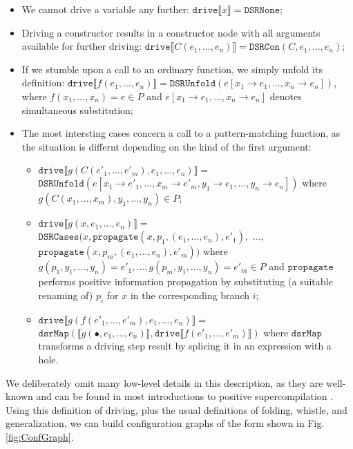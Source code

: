 \documentclass[submission,copyright,creativecommons]{eptcs}
\begin{document}
\begin{itemize}
  \item We cannot drive a variable any further: $\mathtt{drive} \llbracket x \rrbracket = \mathtt{DSRNone}$;
  \item Driving a constructor results in a constructor node with all arguments available for
    further driving: $\mathtt{drive} \llbracket C(e_1, \ldots, e_n) \rrbracket = \mathtt{DSRCon}(C, e_1, \ldots, e_n)$;
  \item If we stumble upon a call to an ordinary function, we simply unfold its definition:
    $\mathtt{drive} \llbracket f(e_1, \ldots, e_n) \rrbracket = \mathtt{DSRUnfold}(e [ x_1\rightarrow e_1, \ldots, x_n\rightarrow e_n ])$,
    where $f(x_1, \ldots, x_n) = e \in P$ and $e [ x_1\rightarrow e_1, \ldots, x_n\rightarrow e_n ] $
    denotes simultaneous substitution;
  \item The most intersting cases concern a call to a pattern-matching function, as the situation is
    differnt depending on the kind of the first argument:
    \begin{itemize}
      \item $\mathtt{drive} \llbracket g(C(e'_1, \ldots, e'_m), e_1, \ldots, e_n) \rrbracket =$
        $\mathtt{DSRUnfold}(e [ x_1\rightarrow e'_1, \ldots, x_m\rightarrow e'_m, y_1 \rightarrow e_1, \ldots, y_n \rightarrow e_n ])$
        where $g(C(x_1, \ldots, x_m), y_1, \ldots, y_n) \in P$;
      \item $\mathtt{drive} \llbracket g(x, e_1, \ldots, e_n) \rrbracket =$
        $\mathtt{DSRCases}(x, \mathtt{propagate}(x, p_1, (e_1, \ldots, e_n), e'_1),$ $\ldots,$ \\
          $\mathtt{propagate}(x, p_m, (e_1, \ldots, e_n), e'_m))$
        where $g(p_1, y_1, \ldots, y_n) = e'_1, \ldots, g(p_m, y_1, \ldots, y_n) = e'_m \in P$
        and $\mathtt{propagate}$ performs positive information propagation by substituting (a suitable renaming of) $p_i$ for $x$ 
        in the corresponding branch $i$;
      \item $\mathtt{drive} \llbracket g(f(e'_1, \ldots, e'_m), e_1, \ldots, e_n) \rrbracket =$
        $\mathtt{dsrMap}(\llbracket g(\bullet, e_1, \ldots, e_n) \rrbracket, \mathtt{drive} \llbracket f(e'_1, \ldots, e'_m) \rrbracket)$
        where $\mathtt{dsrMap}$ transforms a driving step result by splicing it in an expression with a hole.
    \end{itemize}
\end{itemize}
We deliberately omit many low-level details in this description, as they are well-known and can be found
in most introductions to positive supercompilation \cite{Sorensen1994TurchinSupercompiler,sorm98b,TMR/SCP2014}.
Using this definition of driving, plus the usual definitions of folding, whistle, and generalization, 
we can build configuration graphs of the form shown in Fig. \ref{fig:ConfGraph}.
\end{document}
